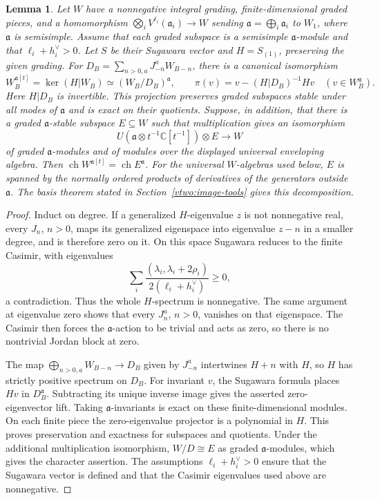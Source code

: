\documentclass[11pt,a4paper]{amsart}
\numberwithin{equation}{section}
\newtheorem{lemma}[theorem]{Lemma}
\theoremstyle{definition}
\theoremstyle{remark}
\newcommand{\C}{\mathbb C}
\newcommand{\ch}{\operatorname{ch}}
\begin{document}
\begin{lemma}
\label{v5:current-projection}
Let $W$ have a nonnegative integral grading, finite-dimensional graded pieces, and
a homomorphism $\bigotimes_iV^{\ell_i}(\mathfrak a_i)\to W$
sending $\mathfrak a=\bigoplus_i\mathfrak a_i$ to $W_1$, where
$\mathfrak a$ is semisimple. Assume that each graded subspace is a
semisimple $\mathfrak a$-module and that $\ell_i+h_i^\vee>0$. Let $S$ be
their Sugawara vector and $H=S_{(1)}$, preserving the given grading.
For $D_B=\sum_{n>0,a}J^a_{-n}W_{B-n}$, there is a canonical isomorphism
$$
 W_B^{\mathfrak a[t]}=\ker(H|W_B)
       \simeq(W_B/D_B)^{\mathfrak a},\qquad
 \pi(v)=v-(H|D_B)^{-1}Hv\quad(v\in W_B^{\mathfrak a}).
$$
Here $H|D_B$ is invertible. This projection preserves graded subspaces stable under all modes of $\mathfrak a$ and is exact on their quotients.
Suppose, in addition, that there is a graded $\mathfrak a$-stable
subspace $E\subseteq W$ such that multiplication gives an isomorphism
$$
 U(\mathfrak a\otimes t^{-1}\C[t^{-1}])\otimes E\longrightarrow W
$$
of graded $\mathfrak a$-modules and of modules over the displayed
universal enveloping algebra. Then
$\ch W^{\mathfrak a[t]}=\ch E^{\mathfrak a}$.
For the universal $W$-algebras used below, $E$ is spanned by the
normally ordered products of derivatives of the generators outside
$\mathfrak a$. The basis theorem stated in Section~\ref{vtwo:image-tools}
gives this decomposition.
\end{lemma}
\begin{proof}
Induct on degree. If a generalized $H$-eigenvalue
$z$ is not nonnegative real, every $J_n$, $n>0$, maps its generalized
eigenspace into eigenvalue $z-n$ in a smaller degree, and is therefore zero on it.
On this space Sugawara reduces to the finite Casimir, with eigenvalues
$$
 \sum_i\frac{(\lambda_i,\lambda_i+2\rho_i)}
                    {2(\ell_i+h_i^\vee)}\ge0,
$$
a contradiction. Thus the whole $H$-spectrum is nonnegative.
The same argument at eigenvalue zero shows that every $J^a_n$, $n>0$,
vanishes on that eigenspace.
The Casimir then forces the $\mathfrak a$-action to be trivial and acts as zero,
so there is no nontrivial Jordan block at zero.

The map $\bigoplus_{n>0,a}W_{B-n}\to D_B$ given by $J^a_{-n}$
intertwines $H+n$ with $H$, so $H$ has strictly positive spectrum on
$D_B$. For invariant $v$, the Sugawara formula places $Hv$ in
$D_B^{\mathfrak a}$. Subtracting its unique inverse image gives the
asserted zero-eigenvector lift. Taking $\mathfrak a$-invariants is exact on these finite-dimensional modules. On
each finite piece the zero-eigenvalue projector is a polynomial in
$H$. This proves preservation and exactness for subspaces and
quotients. Under the additional multiplication isomorphism,
$W/D\cong E$ as graded $\mathfrak a$-modules, which gives the
character assertion.
The assumptions $\ell_i+h_i^\vee>0$ ensure that the Sugawara vector
is defined and that the Casimir eigenvalues used above are nonnegative.
\end{proof}
\end{document}
